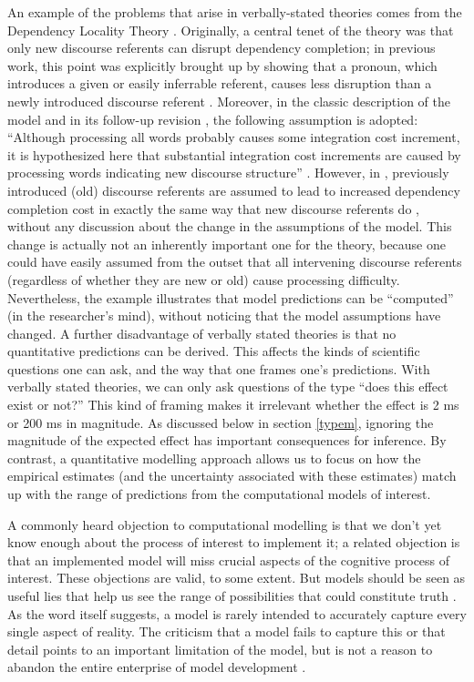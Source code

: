 \documentclass{cambridge7A}\usepackage[]{graphicx}\usepackage[]{color}
\begin{document}
An example of the problems that arise in verbally-stated theories comes from the  Dependency Locality 
Theory \citep{Gibson2000}. Originally, a central tenet of the theory was that only
new discourse referents can disrupt dependency completion; in
previous work, this point was explicitly brought up by showing that a
pronoun, which introduces a given or easily inferrable referent,
causes less disruption than a newly introduced discourse referent
\citep{warrengibson05}. Moreover, in the classic description of the
model \citep{Gibson1998} and in its follow-up revision
\citep{Gibson2000}, the following assumption is adopted: ``Although
processing all words probably causes some integration cost increment,
it is hypothesized here that substantial integration cost increments
are caused by processing words indicating new discourse structure''
\citep[12]{Gibson1998}.  However, in \cite{gibsonwu}, previously
introduced (old) discourse referents are assumed to lead to increased
dependency completion cost in exactly the same way that new  discourse referents do \citep{HsiaoGibson2003}, without any discussion about the change
in the assumptions of the model. This change is actually not an inherently important
one for the theory, because one could have easily assumed from the
outset that all intervening discourse referents (regardless of whether they are new or old) cause 
processing difficulty. Nevertheless, the example illustrates that model
predictions can be ``computed'' (in the researcher's mind), without
noticing that the model assumptions have changed.
A further disadvantage of verbally stated theories is that no 
quantitative predictions can be derived. This affects the kinds of
scientific questions one can ask, and the way that one frames one's predictions. With verbally stated theories, we
can only ask questions of the type ``does this effect exist or not?''
This kind of framing makes it irrelevant whether the effect is 2 ms or 200 ms in
magnitude. As discussed below in section \ref{typem}, ignoring the magnitude of the expected effect has important consequences for inference. By contrast, a  quantitative modelling approach allows us to
focus on how the empirical estimates (and the uncertainty associated
with these estimates) match up with the range of predictions from the
computational models of interest.

A commonly heard objection to computational modelling is that we don't
yet know enough about the process of interest to implement it; a
related objection is that an implemented model will miss crucial
aspects of the cognitive process of interest. These objections are
valid, to some extent. But models should be seen as useful lies that
help us see the range of possibilities that could constitute truth \citep{whymodel}. As the word itself suggests, a
model is rarely intended to accurately capture every single aspect of
reality. The criticism that a model fails to capture this or that detail points to an important limitation of the model, but is not a reason to abandon the entire enterprise of model development  \citep{smaldino2017models}.
\end{document}

